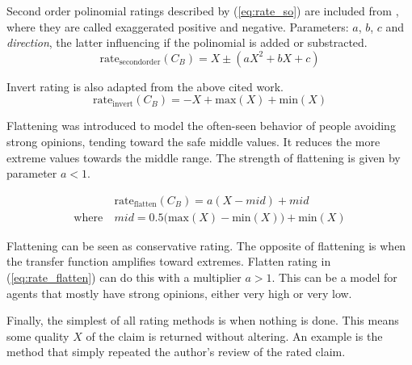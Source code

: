 \documentclass[%
    ]{\PathToTumTemplate/thesis/tum_thesis}
\begin{document}
Second order polinomial ratings described by (\ref{eq:rate_so}) are included from \cite{yu_detecting_2003}, where they are called exaggerated positive and negative.
Parameters: $a$, $b$, $c$ and \emph{direction}, the latter influencing if the polinomial is added or substracted.
\begin{equation}\label{eq:rate_so}
\mathrm{rate_{second order}}(C_B) = X \pm (aX^2+bX+c)
\end{equation}

Invert rating is also adapted from the above cited work.
\begin{equation}\label{eq:rate_invert}
\mathrm{rate_{invert}}(C_B) = -X + \mathrm{max}(X) + \mathrm{min}(X)
\end{equation}

Flattening was introduced to model the often-seen behavior of people avoiding strong opinions, tending toward the safe middle values.
It reduces the more extreme values towards the middle range.
The strength of flattening is given by parameter $a < 1$.

\begin{equation}\label{eq:rate_flatten}
\begin{aligned}
&\mathrm{rate_{flatten}}(C_B) = a(X-mid)+mid \\
\mathrm{where~}&mid = 0.5\big(\mathrm{max}(X) - \mathrm{min}(X) \big) + \mathrm{min}(X)
\end{aligned}
\end{equation}

Flattening can be seen as conservative rating.
The opposite of flattening is when the transfer function amplifies toward extremes.
Flatten rating in (\ref{eq:rate_flatten}) can do this with a multiplier $a > 1$.
This can be a model for agents that mostly have strong opinions, either very high or very low.

Finally, the simplest of all rating methods is when nothing is done.
This means some quality $X$ of the claim is returned without altering.
An example is the method that simply repeated the author's review of the rated claim.
\end{document}
